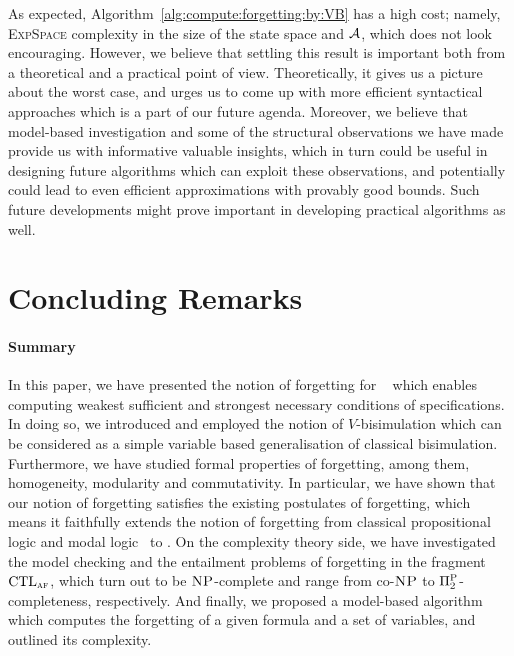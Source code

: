\documentclass{article}
\begin{document}
As expected, Algorithm~\ref{alg:compute:forgetting:by:VB} has a high cost; namely, \textsc{ExpSpace} complexity in the size of the state space and ${\cal A}$, which does not look encouraging. However, we believe that settling this result is important both from a theoretical and a practical point of view. Theoretically, it gives us a picture about the worst case, and urges us to come up with more efficient syntactical approaches which is a part of our future agenda. Moreover, we believe that model-based investigation and some of the structural observations we have made provide us with  informative valuable insights, which in turn could be useful in designing future algorithms which can exploit these observations, and potentially could lead to even efficient approximations with provably good bounds. Such future developments might prove important in developing practical algorithms as well.







\section{Concluding Remarks}
\label{conclusion}
\paragraph{Summary}
In this paper, we have presented the notion of forgetting for \CTL\
which enables computing weakest sufficient and strongest necessary conditions of specifications. In doing so, we introduced and employed the notion of $V$-bisimulation which can be considered as  a simple variable based generalisation of classical bisimulation. Furthermore, we have studied formal properties of forgetting, among them, homogeneity, modularity and commutativity. In particular, we have shown that our notion of forgetting satisfies the existing postulates of forgetting, which means it faithfully extends the notion of forgetting from classical propositional logic and modal logic \SFive\ to \CTL.
On the complexity theory side, we have investigated the model checking and the entailment problems of forgetting in the fragment $\textrm{CTL}_{\textsc{a}\textsc{f}}$, which turn out to be $\textsc{NP}$-complete and range from co-$\textsc{NP}$ to $\Pi_2^\textsc{P}$-completeness, respectively.
And finally, we proposed a model-based algorithm which computes the forgetting of a given formula and a set of variables, and outlined its complexity.
\end{document}
